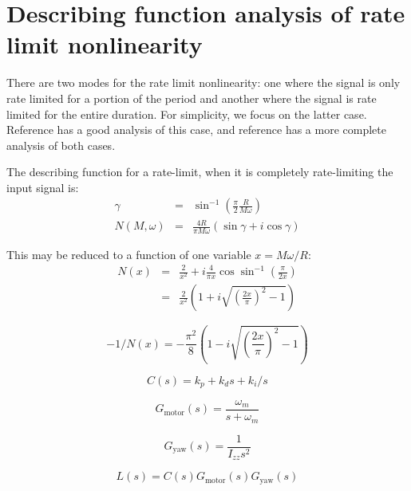 \documentclass{article} %
\begin{document}
\section{Describing function analysis of rate limit nonlinearity}

There are two modes for the rate limit nonlinearity: one where the
signal is only rate limited for a portion of the period and another
where the signal is rate limited for the entire duration.  For
simplicity, we focus on the latter case.  Reference \cite{pratt2000}
has a good analysis of this case, and reference \cite{ponce2003} has a
more complete analysis of both cases.

The describing function for a rate-limit, when it is completely
rate-limiting the input signal is:
\begin{eqnarray}
\gamma &=& \sin^{-1} \left( \frac{\pi}{2} \frac{R}{M \omega} \right) \\
N(M, \omega) &=& \frac{4 R}{\pi M \omega} (\sin \gamma + i \cos \gamma)
\end{eqnarray}

This may be reduced to a function of one variable $x = M \omega / R$:
\begin{eqnarray}
N(x) &=& \frac{2}{x^2} +
i \frac{4}{\pi x} \cos \sin^{-1} \left( \frac{\pi}{2 x} \right) \\
&=& \frac{2}{x^2} \left(1 + i \sqrt{\left(\frac{2 x}{\pi}\right)^2 - 1} \right)
\end{eqnarray}

\begin{equation}
-1/N(x) = -\frac{\pi^2}{8}
\left( 1 - i \sqrt{\left(\frac{2 x}{\pi}\right)^2 - 1} \right)
\end{equation}

\begin{equation}
C(s) = k_p + k_d s + k_i / s
\end{equation}

\begin{equation}
G_{\mathrm{motor}}(s) = \frac{\omega_m}{s + \omega_m}
\end{equation}

\begin{equation}
G_{\mathrm{yaw}}(s) = \frac{1}{I_{zz} s^2}
\end{equation}

\begin{equation}
L(s) = C(s) G_{\mathrm{motor}}(s) G_{\mathrm{yaw}}(s)
\end{equation}
\end{document}
